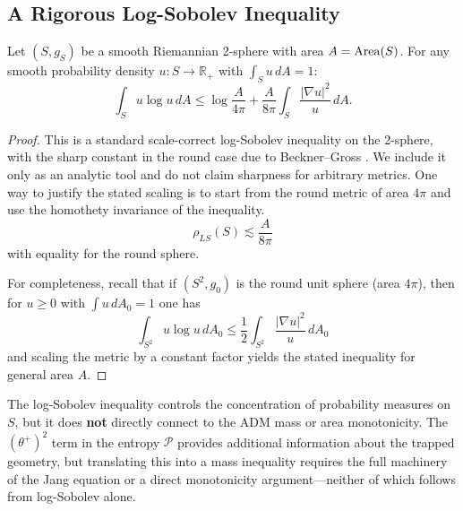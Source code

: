 \subsection{A Rigorous Log-Sobolev Inequality}

\begin{theorem}
\label{thm:logsobolev-rigorous}
Let $(S,g_S)$ be a smooth Riemannian 2-sphere with area $A=\operatorname{Area}(S)$. For any smooth probability density $u: S \to \mathbb{R}_+$ with $\int_S u \, dA = 1$:
\begin{equation}
\int_S u \log u \, dA \leq \log\frac{A}{4\pi} + \frac{A}{8\pi} \int_S \frac{|\nabla u|^2}{u} \, dA.
\end{equation}
\end{theorem}

\begin{proof}
This is a standard scale-correct log-Sobolev inequality on the 2-sphere, with the sharp constant in the round case due to Beckner--Gross \cite{beckner1989,gross1975}.
We include it only as an analytic tool and do not claim sharpness for arbitrary metrics.
One way to justify the stated scaling is to start from the round metric of area $4\pi$ and use the homothety invariance of the inequality.
\begin{equation}
\rho_{LS}(S) \lesssim \frac{A}{8\pi}
\end{equation}
with equality for the round sphere.

For completeness, recall that if $(S^2,g_0)$ is the round unit sphere (area $4\pi$), then for $u\ge 0$ with $\int u\,dA_0=1$ one has
\begin{equation}
\int_{S^2} u \log u \, dA_0 \leq \frac{1}{2}\int_{S^2} \frac{|\nabla u|^2}{u} \, dA_0
\end{equation}
and scaling the metric by a constant factor yields the stated inequality for general area $A$.
\end{proof}

\begin{remark}
The log-Sobolev inequality controls the concentration of probability measures on $S$, but it does \textbf{not} directly connect to the ADM mass or area monotonicity. The $(\theta^+)^2$ term in the entropy $\mathcal{P}$ provides additional information about the trapped geometry, but translating this into a mass inequality requires the full machinery of the Jang equation or a direct monotonicity argument---neither of which follows from log-Sobolev alone.
\end{remark}

